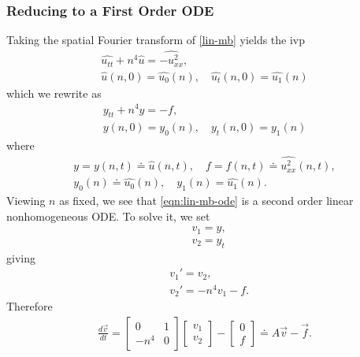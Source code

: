 \documentclass[12pt,reqno]{amsart}
\numberwithin{equation}{section}  %
\numberwithin{figure}{section}
\newcommand{\wh}{\widehat}
\theoremstyle{plain}
\theoremstyle{definition}
\theoremstyle{remark}
\begin{document}
\subsubsection{Reducing to a First Order ODE} 
\label{sssec:first-order-ode}
Taking the spatial Fourier transform of \eqref{lin-mb} yields
the ivp
%
%
\begin{gather*}
  \wh{u_{tt}} + n^{4} \wh{u} = \wh{-u^{2}_{xx}},
  \\
  \wh{u}(n, 0) = \wh{u_{0}}(n), \quad \wh{u_{t}}(n, 0) = \wh{u_{1}}(n)
\end{gather*}
%
%
which we rewrite as 
%
%
\begin{gather}
  \label{eqn:lin-mb-ode}
  y_{tt} + n^{4}y = -f,
  \\
  y(n, 0) = y_{0}(n), \quad y_{t}(n, 0) = y_{1}(n)
\label{eqn:lin-mb-ode-init-data}
\end{gather}
%
%
where
%
%
\begin{gather*}
  \label{not-1}
  y = y(n, t) \doteq \wh{u}(n, t), \quad f = f(n, t) \doteq
  \wh{u^{2}_{xx}}(n,t),
  \\
  \label{not-2}
  y_{0}(n) \doteq \wh{u_{0}}(n), \quad y_{1}(n) = \wh{u_{1}}(n).
\end{gather*}
%
%
Viewing $n$ as fixed, we see that \eqref{eqn:lin-mb-ode} is a second order
linear nonhomogeneous ODE. To solve it, we set 
%
%
\begin{equation*}
  \label{not-3}
\begin{split}
   & v_{1} = y, 
   \\
   & v_{2} = y_{t}
\end{split}
\end{equation*}
%
%
giving
%
%
\begin{equation*}
\begin{split}
  & v_{1}' = v_{2},
  \\
  & v_{2}' = -n^{4}v_{1} - f.
\end{split}
\end{equation*}
%
%
Therefore 
%
%
\begin{equation}
\begin{split}
\frac{d \vec v}{dt} = 
\begin{bmatrix}
0 & 1 \\
-n^{4} & 0
\end{bmatrix}
\begin{bmatrix}
  v_{1}\\
  v_{2}
\end{bmatrix}
-
\begin{bmatrix}
0\\
f
\end{bmatrix}
\doteq A \vec v - \vec f.
\end{split}
\label{eqn:first-order-ode-reduction}
\end{equation}
\end{document}
